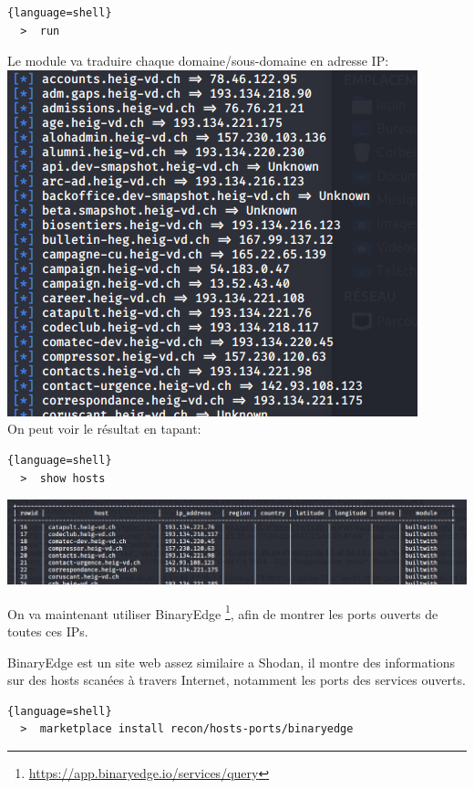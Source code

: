 \begin{lstlisting}{language=shell}
  >  run
\end{lstlisting}

Le module va traduire chaque domaine/sous-domaine en adresse IP: \\

\includegraphics[scale=0.48]{images/SEN_Projet_Image021.png} \\

On peut voir le résultat en tapant:

\begin{lstlisting}{language=shell}
  >  show hosts
\end{lstlisting}

\includegraphics[scale=0.48]{images/SEN_Projet_Image022.png}

On va maintenant utiliser BinaryEdge \footnote{\url{https://app.binaryedge.io/services/query}}, afin de montrer les ports ouverts de toutes ces IPs.

BinaryEdge est un site web assez similaire a Shodan, il montre des informations sur des hosts scanées à travers
Internet, notamment les ports des services ouverts.

\begin{lstlisting}{language=shell}
  >  marketplace install recon/hosts-ports/binaryedge
\end{lstlisting}

